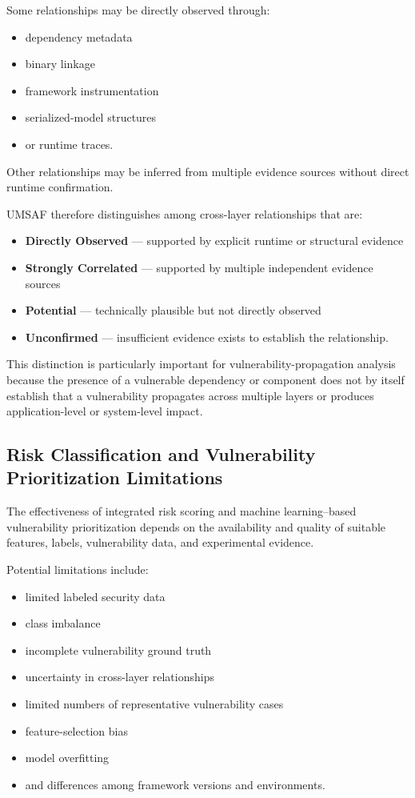 \documentclass[
  12pt,
  letterpaper,
  oneside]{report}
\providecommand{\tightlist}{%
  \setlength{\itemsep}{0pt}\setlength{\parskip}{0pt}}
\begin{document}
Some relationships may be directly observed through:

\begin{itemize}
\tightlist
\item
  dependency metadata
\item
  binary linkage
\item
  framework instrumentation
\item
  serialized-model structures
\item
  or runtime traces.
\end{itemize}

Other relationships may be inferred from multiple evidence sources
without direct runtime confirmation.

UMSAF therefore distinguishes among cross-layer relationships that are:

\begin{itemize}
\tightlist
\item
  \textbf{Directly Observed} --- supported by explicit runtime or
  structural evidence
\item
  \textbf{Strongly Correlated} --- supported by multiple independent
  evidence sources
\item
  \textbf{Potential} --- technically plausible but not directly observed
\item
  \textbf{Unconfirmed} --- insufficient evidence exists to establish the
  relationship.
\end{itemize}

This distinction is particularly important for vulnerability-propagation
analysis because the presence of a vulnerable dependency or component
does not by itself establish that a vulnerability propagates across
multiple layers or produces application-level or system-level impact.

\subsection{Risk Classification and Vulnerability Prioritization Limitations}\label{1319-risk-classification-and-vulnerability-prioritization-limitations}

The effectiveness of integrated risk scoring and machine learning--based
vulnerability prioritization depends on the availability and quality of
suitable features, labels, vulnerability data, and experimental
evidence.

Potential limitations include:

\begin{itemize}
\tightlist
\item
  limited labeled security data
\item
  class imbalance
\item
  incomplete vulnerability ground truth
\item
  uncertainty in cross-layer relationships
\item
  limited numbers of representative vulnerability cases
\item
  feature-selection bias
\item
  model overfitting
\item
  and differences among framework versions and environments.
\end{itemize}
\end{document}
